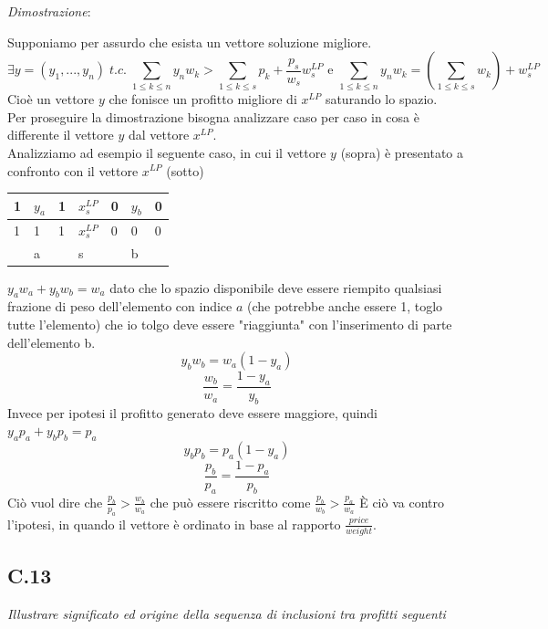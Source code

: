 \documentclass[a4paper]{article}
\newenvironment{dimostrazione}{\textit{Dimostrazione}:\begin{adjustwidth}{1cm}{}}{\end{adjustwidth}}
\begin{document}
\begin{dimostrazione}
	Supponiamo per assurdo che esista un vettore soluzione migliore.
	$$ \exists y =(y_1, ..., y_n) \; t.c. \; \sum_{1 \leq k \leq n}y_nw_k > \sum_{1 \leq k \leq s} p_k+\frac{p_s}{w_s}w_s^{LP} \text{ e }\sum_{1 \leq k \leq n}y_nw_k = (\sum_{1 \leq k \leq s}w_k)+ w_s^{LP}  $$
	Cioè un vettore $y$ che fonisce un profitto migliore di $x^{LP}$ saturando lo spazio.\\
	Per proseguire la dimostrazione bisogna analizzare caso per caso in cosa è differente il vettore $y$ dal vettore $x^{LP}$.\\
	Analizziamo ad esempio il seguente caso, in cui il vettore $y$ (sopra) è presentato a confronto con il vettore $x^{LP}$ (sotto)
	\begin{table}[!ht]
		\centering
\begin{tabular}{lllllll}
\hline
\multicolumn{1}{|l|}{1} & \multicolumn{1}{l|}{$y_a$} & \multicolumn{1}{l|}{1} & \multicolumn{1}{l|}{$x_s^{LP}$} & \multicolumn{1}{l|}{0} & \multicolumn{1}{l|}{$y_b$} & \multicolumn{1}{l|}{0} \\ \hline
\multicolumn{1}{|l|}{1} & \multicolumn{1}{l|}{1}    & \multicolumn{1}{l|}{1} & \multicolumn{1}{l|}{$x_s^{LP}$} & \multicolumn{1}{l|}{0} & \multicolumn{1}{l|}{0}    & \multicolumn{1}{l|}{0} \\ \hline
                        & a                         &                        & s                                                 &                        & b                         &                       
\end{tabular}
\end{table}
$y_aw_a +  y_bw_b = w_a$ dato che lo spazio disponibile deve essere riempito qualsiasi frazione di peso dell'elemento con indice $a$ (che potrebbe anche essere 1, toglo tutte l'elemento) che io tolgo deve essere "riaggiunta" con l'inserimento di parte dell'elemento b.
$$y_bw_b=w_a(1-y_a)$$
$$\frac{w_b}{w_a}=\frac{1-y_a}{y_b}$$
Invece per ipotesi il profitto generato deve essere maggiore, quindi $y_ap_a +  y_bp_b = p_a$
$$y_bp_b=p_a(1-y_a)$$
$$\frac{p_b}{p_a}=\frac{1-p_a}{p_b}$$
Ciò vuol dire che $\frac{p_b}{p_a} > \frac{w_b}{w_a}$ che può essere riscritto come $\frac{p_b}{w_b} > \frac{p_a}{w_a}$%
È ciò va contro l'ipotesi, in quando il vettore è ordinato in base al rapporto $\frac{price}{weight}$.
\end{dimostrazione}
\subsection{C.13}
\label{SEC:C.13}
\emph{Illustrare significato ed origine della sequenza di inclusioni tra profitti seguenti}
\end{document}
